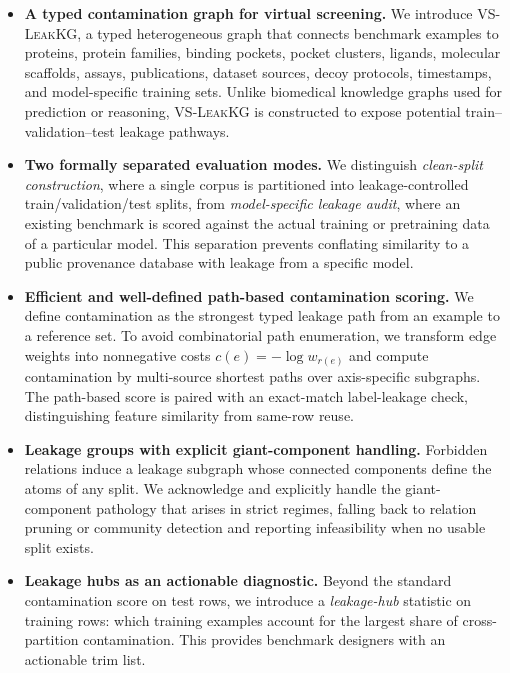 \documentclass[11pt]{article}
\begin{document}
\begin{itemize}[leftmargin=*]
    \item \textbf{A typed contamination graph for virtual screening.}
    We introduce \textsc{VS-LeakKG}, a typed heterogeneous graph that connects benchmark examples to proteins, protein families, binding pockets, pocket clusters, ligands, molecular scaffolds, assays, publications, dataset sources, decoy protocols, timestamps, and model-specific training sets. Unlike biomedical knowledge graphs used for prediction or reasoning, \textsc{VS-LeakKG} is constructed to expose potential train--validation--test leakage pathways.

    \item \textbf{Two formally separated evaluation modes.}
    We distinguish \emph{clean-split construction}, where a single corpus is partitioned into leakage-controlled train/validation/test splits, from \emph{model-specific leakage audit}, where an existing benchmark is scored against the actual training or pretraining data of a particular model. This separation prevents conflating similarity to a public provenance database with leakage from a specific model.

    \item \textbf{Efficient and well-defined path-based contamination scoring.}
    We define contamination as the strongest typed leakage path from an example to a reference set. To avoid combinatorial path enumeration, we transform edge weights into nonnegative costs \(c(e) = -\log w_{r(e)}\) and compute contamination by multi-source shortest paths over axis-specific subgraphs. The path-based score is paired with an exact-match label-leakage check, distinguishing feature similarity from same-row reuse.

    \item \textbf{Leakage groups with explicit giant-component handling.}
    Forbidden relations induce a leakage subgraph whose connected components define the atoms of any split. We acknowledge and explicitly handle the giant-component pathology that arises in strict regimes, falling back to relation pruning or community detection and reporting infeasibility when no usable split exists.

    \item \textbf{Leakage hubs as an actionable diagnostic.}
    Beyond the standard contamination score on test rows, we introduce a \emph{leakage-hub} statistic on training rows: which training examples account for the largest share of cross-partition contamination. This provides benchmark designers with an actionable trim list.


\end{itemize}
\end{document}
